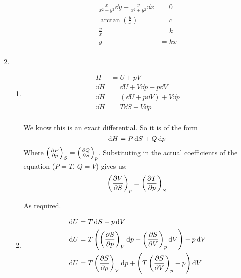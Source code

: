 \documentclass[10pt,\jkfside,a4paper]{article}
\begin{document}
\begin{enumerate}
\begin{enumerate}
\begin{equation}
\begin{split}
\frac{x}{x^2 + y^2} \dd{y} - \frac{y}{x^2 + y^2} \dd{x} &= 0 \\
\arctan\left(\frac{y}{x}\right) &= c \\
\frac{y}{x} &= k \\
y &= kx \\
\end{split}
\end{equation}

\end{enumerate}

\item 

\begin{enumerate}

\item 

\begin{equation}
\begin{split}
H &= U + pV \\
\dd{H} &= \dd{U} + V\dd{p} + p\dd{V} \\
\dd{H} &= (\dd{U} + p\dd{V}) + V\dd{p} \\
\dd{H} &= T\dd{S} + V\dd{p} \\
\end{split}
\end{equation}

We know this is an exact differential. So it is of the form 
\begin{equation}
\dd{H} = P \dd{S} + Q\dd{p}\\
\end{equation}
Where $\left(\pdv{P}{p}\right)_S = \left(\pdv{Q}{S}\right)_p$. Substituting in the actual coefficients 
of the equation ($P = T$, $Q = V$) gives us:
\begin{equation}
\left(\pdv{V}{S}\right)_p = \left(\pdv{T}{p}\right)_S\\
\end{equation}

As required.

\item 

\begin{equation}
\begin{split}
\dd{U} &= T\dd{S} - p\dd{V} \\
\dd{U} &= T\left(\left(\pdv{S}{p}\right)_V\dd{p} + \left(\pdv{S}{V}\right)_p\dd{V}\right) - p\dd{V} \\
\dd{U} &= T\left(\pdv{S}{p}\right)_V\dd{p} + \left(T\left(\pdv{S}{V}\right)_p- p\right)\dd{V} \\
\end{split}
\end{equation}


\end{enumerate}
\end{enumerate}
\end{document}
